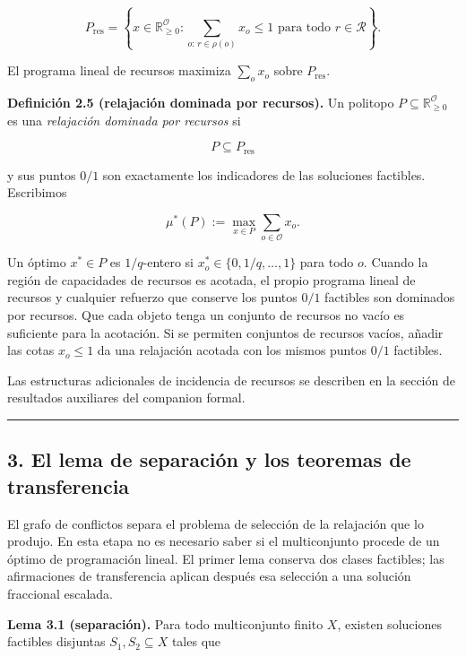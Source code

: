 \documentclass[spanish,11pt,a4paper]{article}
\begin{document}
\[
P_{\mathrm{res}}
=
\left\{
x\in\mathbb R_{\ge0}^{\mathcal O}:
\sum_{o:\,r\in\rho(o)}x_o\le1
\text{ para todo }r\in\mathcal R
\right\}.
\]

El programa lineal de recursos maximiza \(\sum_o x_o\) sobre
\(P_{\mathrm{res}}\).

\textbf{Definición 2.5 (relajación dominada por recursos).} Un politopo
\(P\subseteq\mathbb R_{\ge0}^{\mathcal O}\) es una \emph{relajación
dominada por recursos} si

\[
P\subseteq P_{\mathrm{res}}
\]

y sus puntos \(0/1\) son exactamente los indicadores de las soluciones
factibles. Escribimos

\[
\mu^*(P):=\max_{x\in P}\sum_{o\in\mathcal O}x_o.
\]

Un óptimo \(x^*\in P\) es \(1/q\)-entero si
\(x_o^*\in\{0,1/q,\ldots,1\}\) para todo \(o\). Cuando la región de
capacidades de recursos es acotada, el propio programa lineal de
recursos y cualquier refuerzo que conserve los puntos \(0/1\) factibles
son dominados por recursos. Que cada objeto tenga un conjunto de
recursos no vacío es suficiente para la acotación. Si se permiten
conjuntos de recursos vacíos, añadir las cotas \(x_o\le1\) da una
relajación acotada con los mismos puntos \(0/1\) factibles.

Las estructuras adicionales de incidencia de recursos se describen en la
sección de resultados auxiliares del companion formal.

\begin{center}\rule{0.5\linewidth}{0.5pt}\end{center}

\subsection{3. El lema de separación y los teoremas de
transferencia}\label{el-lema-de-separaciuxf3n-y-los-teoremas-de-transferencia}

El grafo de conflictos separa el problema de selección de la relajación
que lo produjo. En esta etapa no es necesario saber si el multiconjunto
procede de un óptimo de programación lineal. El primer lema conserva dos
clases factibles; las afirmaciones de transferencia aplican después esa
selección a una solución fraccional escalada.

\textbf{Lema 3.1 (separación).} Para todo multiconjunto finito \(X\),
existen soluciones factibles disjuntas \(S_1,S_2\subseteq X\) tales que
\end{document}
